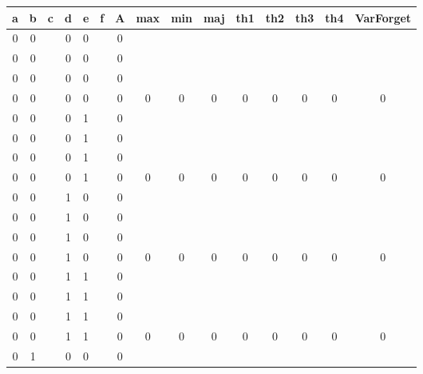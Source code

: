 \begin{table}[!tb]
    \centering
    \begin{tabular}{|c|c|c|c|c|c|c|c|c|c|c|c|c|c|c|}
        \hline
        \textbf{a} & \textbf{b} & \textbf{c} & \textbf{d} & \textbf{e} & \textbf{f} & \textbf{A} & \textbf{max} & \textbf{min} & \textbf{maj} & \textbf{th1} & \textbf{th2} & \textbf{th3} & \textbf{th4} & \textbf{VarForget} \\ \hline
        \rowcolor{gray!40} 0 & 0 &  & 0 & 0 &  & 0 &  &  &  &  &  &  &  &  \\ \hline
        \rowcolor{gray!40} 0 & 0 &  & 0 & 0 &  & 0 &  &  &  &  &  &  &  &  \\ \hline
        \rowcolor{gray!40} 0 & 0 &  & 0 & 0 &  & 0 &  &  &  &  &  &  &  &  \\ \hline
        \rowcolor{gray!40} 0 & 0 &  & 0 & 0 &  & 0 & 0 & 0 & 0 & 0 & 0 & 0 & 0 & 0 \\ \hline
        \rowcolor{blue!40} 0 & 0 &  & 0 & 1 &  & 0 &  &  &  &  &  &  &  &  \\ \hline
        \rowcolor{blue!40} 0 & 0 &  & 0 & 1 &  & 0 &  &  &  &  &  &  &  &  \\ \hline
        \rowcolor{blue!40} 0 & 0 &  & 0 & 1 &  & 0 &  &  &  &  &  &  &  &  \\ \hline
        \rowcolor{blue!40} 0 & 0 &  & 0 & 1 &  & 0 & 0 & 0 & 0 & 0 & 0 & 0 & 0 & 0 \\ \hline
        \rowcolor{red!40} 0 & 0 &  & 1 & 0 &  & 0 &  &  &  &  &  &  &  &  \\ \hline
        \rowcolor{red!40} 0 & 0 &  & 1 & 0 &  & 0 &  &  &  &  &  &  &  &  \\ \hline
        \rowcolor{red!40} 0 & 0 &  & 1 & 0 &  & 0 &  &  &  &  &  &  &  &  \\ \hline
        \rowcolor{red!40} 0 & 0 &  & 1 & 0 &  & 0 & 0 & 0 & 0 & 0 & 0 & 0 & 0 & 0 \\ \hline
        \rowcolor{green!40} 0 & 0 &  & 1 & 1 &  & 0 &  &  &  &  &  &  &  &  \\ \hline
        \rowcolor{green!40} 0 & 0 &  & 1 & 1 &  & 0 &  &  &  &  &  &  &  &  \\ \hline
        \rowcolor{green!40} 0 & 0 &  & 1 & 1 &  & 0 &  &  &  &  &  &  &  &  \\ \hline
        \rowcolor{green!40} 0 & 0 &  & 1 & 1 &  & 0 & 0 & 0 & 0 & 0 & 0 & 0 & 0 & 0 \\ \hline
        \rowcolor{yellow!40} 0 & 1 &  & 0 & 0 &  & 0 &  &  &  &  &  &  &  &  \\ \hline

\end{tabular}
\end{table}
